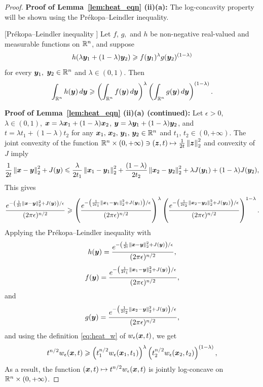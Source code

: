 \begin{proof}
\textbf{Proof of Lemma~\ref{lem:heat_eqn} (ii)(a):} The log-concavity property will be shown using the Pr\'ekopa--Leindler inequality.
\begin{thm}\label{thm:prekopa}
[Pr\'ekopa--Leindler inequality \citep{leindler1972certain, prekopa1971logarithmic}]
Let $f$, $g,$ and $h$ be non-negative real-valued and measurable functions on $\mathbb{R}^n$, and suppose
\[
h(\lambda\boldsymbol{y}_{1}+(1-\lambda)\boldsymbol{y}_{2})\geqslant f(\boldsymbol{y}_{1})^{\lambda}g(\boldsymbol{y}_{2})^{(1-\lambda)}
\]
for every $\boldsymbol{y}_{1},$ $\boldsymbol{y}_{2}\in\mathbb{R}^n$ and $\lambda\in(0,1)$. Then
\[
\int_{\mathbb{R}^n}h(\boldsymbol{y})\mathop{}\!d\boldsymbol{y}\geqslant\left(\int_{\mathbb{R}^n}f(\boldsymbol{y})\mathop{}\!d\boldsymbol{y}\right)^{\lambda}\left(\int_{\mathbb{R}^n}g(\boldsymbol{y})\mathop{}\!d\boldsymbol{y}\right)^{(1-\lambda)}.
\]
\end{thm}
\textbf{Proof of Lemma~\ref{lem:heat_eqn} (ii)(a) (continued):} Let $\epsilon>0$, $\lambda\in(0,1)$, $\boldsymbol{x}=\lambda\boldsymbol{x}_{1}+(1-\lambda)\boldsymbol{x}_{2}$, $\boldsymbol{y}=\lambda\boldsymbol{y}_{1}+(1-\lambda)\boldsymbol{y}_{2}$, and $t=\lambda t_{1}+(1-\lambda)t_{2}$ for any $\boldsymbol{x}_{1},\,\boldsymbol{x}_{2},\,\boldsymbol{y}_{1},\,\boldsymbol{y}_{2}\in\mathbb{R}^n$ and $t_{1},\,t_{2}\in(0,+\infty)$. The joint convexity of the function $\mathbb{R}^n\times(0,+\infty)\ni(\boldsymbol{z},t)\mapsto\frac{1}{2t}\left\Vert \boldsymbol{z}\right\Vert _{2}^{2}$ and convexity of $J$ imply
\[
\frac{1}{2t}\left\Vert \boldsymbol{x}-\boldsymbol{y}\right\Vert _{2}^{2}+J(\boldsymbol{y}) \leqslant \frac{\lambda}{2t_{1}}\left\Vert \boldsymbol{x}_{1}-\boldsymbol{y}_{1}\right\Vert _{2}^{2}+\frac{(1-\lambda)}{2t_{2}}\left\Vert \boldsymbol{x}_{2}-\boldsymbol{y}_{2}\right\Vert _{2}^{2}+\lambda J(\boldsymbol{y}_{1})+(1-\lambda)J(\boldsymbol{y}_{2}),
\]
This gives
\[
\frac{e^{-\left(\frac{1}{2t}\left\Vert \boldsymbol{x}-\boldsymbol{y}\right\Vert _{2}^{2}+J(\boldsymbol{y})\right)/\epsilon}}{(2\pi\epsilon)^{n/2}}\geqslant\left(\frac{e^{-\left(\frac{1}{2t_{1}}\left\Vert \boldsymbol{x}_{1}-\boldsymbol{y}_{1}\right\Vert _{2}^{2}+J(\boldsymbol{y}_{1})\right)/\epsilon}}{(2\pi\epsilon)^{n/2}}\right)^{\lambda}\left(\frac{e^{-\left(\frac{1}{2t_{2}}\left\Vert \boldsymbol{x}_{2}-\boldsymbol{y}_{2}\right\Vert _{2}^{2}+J(\boldsymbol{y}_{2})\right)/\epsilon}}{(2\pi\epsilon)^{n/2}}\right)^{1-\lambda}.
\]
Applying the Pr\'ekopa--Leindler inequality with
\[
h(\boldsymbol{y})=\frac{e^{-\left(\frac{1}{2t}\left\Vert \boldsymbol{x}-\boldsymbol{y}\right\Vert _{2}^{2}+J(\boldsymbol{y})\right)/\epsilon}}{(2\pi\epsilon)^{n/2}},
\]
\[
f(\boldsymbol{y})=\frac{e^{-\left(\frac{1}{2t_{1}}\left\Vert \boldsymbol{x}_{1}-\boldsymbol{y}\right\Vert _{2}^{2}+J(\boldsymbol{y})\right)/\epsilon}}{(2\pi\epsilon)^{n/2}},
\]
and 
\[
g(\boldsymbol{y})=\frac{e^{-\left(\frac{1}{2t_{2}}\left\Vert \boldsymbol{x}_{2}-\boldsymbol{y}\right\Vert _{2}^{2}+J(\boldsymbol{y})\right)/\epsilon}}{(2\pi\epsilon)^{n/2}},
\]
and using the definition \eqref{eq:heat_w} of $w_{\epsilon}(\boldsymbol{x},t)$, we get
\[
t^{n/2}w_{\epsilon}(\boldsymbol{x},t)\geqslant\left(t_{1}^{n/2}w_{\epsilon}(\boldsymbol{x}_{1},t_{1})\right)^{\lambda}\left(t_{2}^{n/2}w_{\epsilon}(\boldsymbol{x}_{2},t_{2})\right)^{(1-\lambda)},
\]
As a result, the function $(\boldsymbol{x},t)\mapsto t^{n/2}w_{\epsilon}(\boldsymbol{x},t)$ is jointly log-concave on $\mathbb{R}^n\times(0,+\infty)$.


\end{proof}
